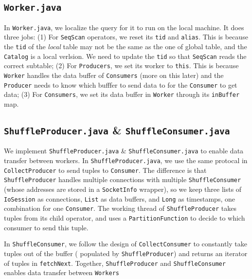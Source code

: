 \documentclass[12pt]{myland}
\def\<#1>{\texttt{#1}}
\begin{document}
    \subsection{\<Worker.java>}
    In \<Worker.java>, we localize the query for it to run on the local machine. It does three jobs: (1) For \<SeqScan>
    operators, we reset its \<tid> and \<alias>. This is because the \<tid> of the \emph{local} table may not be the
    same as the one of global table, and the \<Catalog> is a local verlsion. We need to update the \<tid> so that
    \<SeqScan> reads the correct subtable; (2) For \<Producers>, we set its worker to \<this>. This is because \<Worker>
    handles the data buffer of \<Consumers> (more on this later) and the \<Producer> needs to know which bufffer to send
    data to for the \<Consumer> to get data; (3) For \<Consumers>, we set its data buffer in \<Worker> through its
    \<inBuffer> map.

    \subsection{\<ShuffleProducer.java> \& \<ShuffleConsumer.java>}
    We implement \<ShuffleProducer.java> \& \<ShuffleConsumer.java> to enable data transfer between workers. In
    \<ShuffleProducer.java>, we use the same protocal in \<CollectProducer> to send tuples to \<Consumer>. The difference
    is that \<ShuffleProducer> handles multiple connections with multiple \<ShuffleConsumer> (whose addresses
    are stored in a \<SocketInfo> wrapper), so we keep three lists of \<IoSession> as connections, \<List> as data buffers,
    and \<Long> as timestamps, one combination for one \<Consumer>. The working thread of \<ShuffleProducer> takes
    tuples from its child operator, and uses a \<PartitionFunction> to decide to which consumer to send this tuple. \par

    In \<ShuffleConsumer>, we follow the design of \<CollectConsumer> to constantly take tuples out of the buffer (
    populated by \<ShuffleProducer>) and returns an iterator of tuples in \texttt{fetchNext}. Together, \<ShuffleProducer>
    and \<ShuffleConsumer> enables data transfer between \<Workers>
\end{document}
